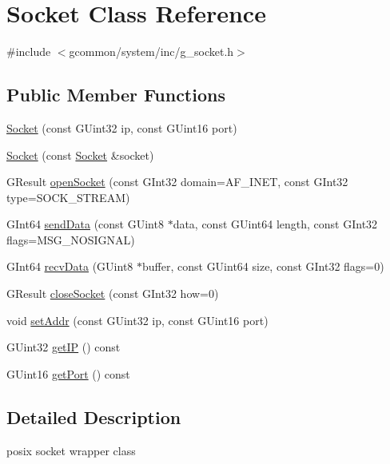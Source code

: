 \hypertarget{class_socket}{\section{Socket Class Reference}
\label{class_socket}
}


{\ttfamily \#include $<$gcommon/system/inc/g\-\_\-socket.\-h$>$}

\subsection*{Public Member Functions}
\begin{DoxyCompactItemize}
\item 
\hyperlink{class_socket_abf07ad463fdba77fbf73d1cd79065fe5}{Socket} (const G\-Uint32 ip, const G\-Uint16 port)
\item 
\hyperlink{class_socket_ad55073e6cf9e64bd24a4b3f2add476bd}{Socket} (const \hyperlink{class_socket}{Socket} \&socket)
\item 
G\-Result \hyperlink{class_socket_a57de7be4c2e2a0b7419bc9491dd07742}{open\-Socket} (const G\-Int32 domain=A\-F\-\_\-\-I\-N\-E\-T, const G\-Int32 type=S\-O\-C\-K\-\_\-\-S\-T\-R\-E\-A\-M)
\item 
G\-Int64 \hyperlink{class_socket_a14642fefcea6fda13b94a65c8704714b}{send\-Data} (const G\-Uint8 $\ast$data, const G\-Uint64 length, const G\-Int32 flags=M\-S\-G\-\_\-\-N\-O\-S\-I\-G\-N\-A\-L)
\item 
G\-Int64 \hyperlink{class_socket_ac3dc555a442ca644e0e01b581cdff58e}{recv\-Data} (G\-Uint8 $\ast$buffer, const G\-Uint64 size, const G\-Int32 flags=0)
\item 
G\-Result \hyperlink{class_socket_a05b7fc327170642cc9175d8b916720ce}{close\-Socket} (const G\-Int32 how=0)
\item 
void \hyperlink{class_socket_ac7df4816b66a15e819a973d8f0f42517}{set\-Addr} (const G\-Uint32 ip, const G\-Uint16 port)
\item 
G\-Uint32 \hyperlink{class_socket_ac817892502e4501630ad3146b7919e8a}{get\-I\-P} () const 
\item 
G\-Uint16 \hyperlink{class_socket_a8d30868500981371e9c65f198988f092}{get\-Port} () const 
\end{DoxyCompactItemize}


\subsection{Detailed Description}
posix socket wrapper class 

